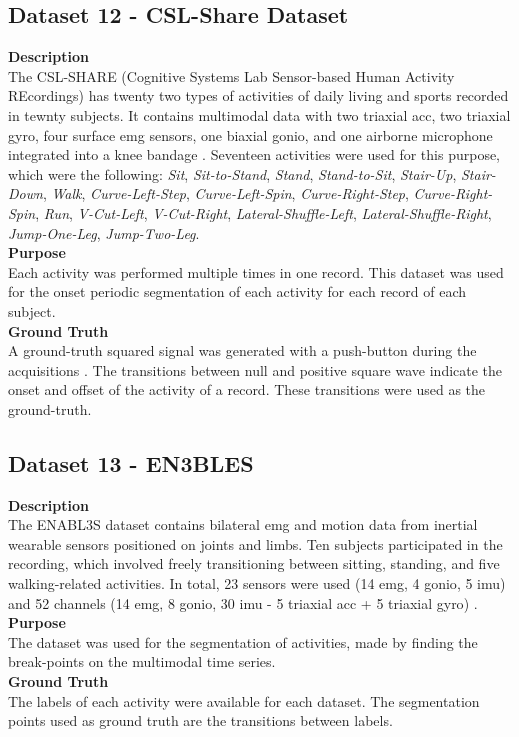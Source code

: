 \subsection{Dataset 12 - CSL-Share Dataset}
\label{dat:dataset12}
\textbf{Description} \hfill \\
The CSL-SHARE (Cognitive Systems Lab Sensor-based Human Activity REcordings) has twenty two types of activities of daily living and sports recorded in tewnty subjects. It contains multimodal data with two triaxial \gls{acc}, two triaxial \gls{gyro}, four surface \gls{emg} sensors, one biaxial \gls{gonio}, and one airborne microphone integrated into a knee bandage \cite{share}. Seventeen activities were used for this purpose, which were the following: \textit{Sit}, \textit{Sit-to-Stand}, \textit{Stand}, \textit{Stand-to-Sit}, \textit{Stair-Up}, \textit{Stair-Down}, \textit{Walk}, \textit{Curve-Left-Step}, \textit{Curve-Left-Spin}, \textit{Curve-Right-Step}, \textit{Curve-Right-Spin}, \textit{Run}, \textit{V-Cut-Left}, \textit{V-Cut-Right}, \textit{Lateral-Shuffle-Left}, \textit{Lateral-Shuffle-Right}, \textit{Jump-One-Leg}, \textit{Jump-Two-Leg}.\\
\textbf{Purpose}\\
Each activity was performed multiple times in one record. This dataset was used for the onset periodic segmentation of each activity for each record of each subject.\\
\textbf{Ground Truth}\\
A ground-truth squared signal was generated with a push-button during the acquisitions \cite{share}. The transitions between null and positive square wave indicate the onset and offset of the activity of a record. These transitions were used as the ground-truth.

\subsection{Dataset 13 - EN3BLES}
\label{dat:dataset13}
\textbf{Description}\\
The ENABL3S dataset contains bilateral \gls{emg} and motion data from inertial wearable sensors positioned on joints and limbs. Ten subjects participated in the recording, which involved freely transitioning between sitting, standing, and five walking-related activities. In total, 23 sensors were used (14 \gls{emg}, 4 \gls{gonio}, 5 \gls{imu}) and 52 channels (14 \gls{emg}, 8 \gls{gonio}, 30 \gls{imu} - 5 triaxial \gls{acc} + 5 triaxial \gls{gyro}) \cite{enables}.\\
\textbf{Purpose}\\
The dataset was used for the segmentation of activities, made by finding the break-points on the multimodal time series.\\
\textbf{Ground Truth}\\
The labels of each activity were available for each dataset. The segmentation points used as ground truth are the transitions between labels.

